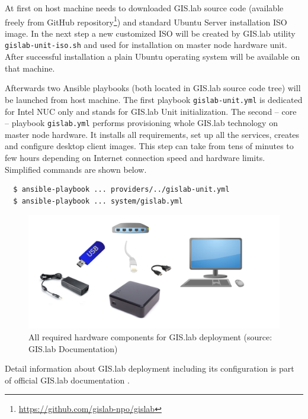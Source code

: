 \documentclass{isprs}
\begin{document}
At first on host machine needs to downloaded GIS.lab source code
(available freely from GitHub
repository\footnote{\url{https://github.com/gislab-npo/gislab}}) and
standard Ubuntu Server installation ISO image. In the next step a new
customized ISO will be created by GIS.lab utility
\texttt{gislab-unit-iso.sh} and used for installation on master node
hardware unit. After successful installation a plain Ubuntu operating
system will be available on that machine.

Afterwards two Ansible playbooks (both located in GIS.lab source code
tree) will be launched from host machine. The first playbook
\texttt{gislab-unit.yml} is dedicated for Intel NUC only and stands
for GIS.lab Unit initialization. The second -- core -- playbook
\texttt{gislab.yml} performs provisioning whole GIS.lab technology on
master node hardware. It installs all requirements, set up all the
services, creates and configure desktop client images. This step can
take from tens of minutes to few hours depending on Internet
connection speed and hardware limits. Simplified commands are shown
below.

\begin{lstlisting}
  $ ansible-playbook ... providers/../gislab-unit.yml
  $ ansible-playbook ... system/gislab.yml
\end{lstlisting}

\begin{figure}[ht!]
\begin{center}
  \includegraphics[width=1.0\columnwidth]{figures/installation-unit.png}
  \caption{All required hardware components for GIS.lab deployment
    (source: GIS.lab Documentation)}
\label{fig:gislab_infrastructure}
\end{center}
\end{figure}

Detail information about GIS.lab deployment including its
configuration is part of official GIS.lab documentation
\cite{gislab-docs}.
\end{document}
